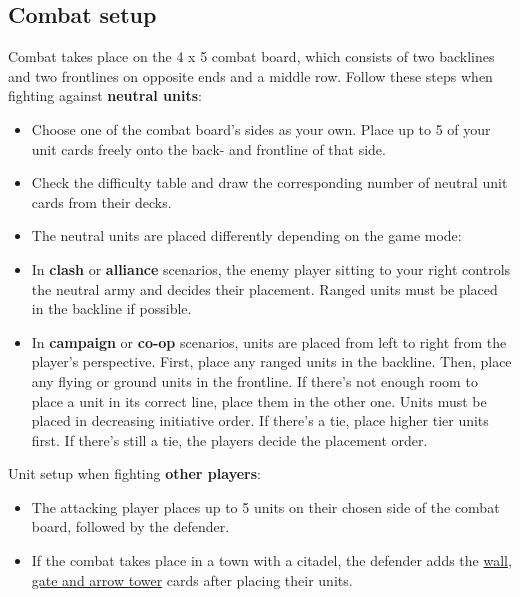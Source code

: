 \documentclass[12pt]{article}
\begin{document}
\subsection*{\hypertarget{Combatsetup}{Combat setup}}

Combat takes place on the 4 x 5 combat board, which consists of two backlines and two frontlines on opposite ends and a middle row. Follow these steps when fighting against \textbf{neutral units}:

\begin{itemize}
 \item Choose one of the combat board’s sides as your own. Place up to 5 of your unit cards freely onto the back- and frontline of that side.
  \item Check the difficulty table and draw the corresponding number of neutral unit cards from their decks.
  \item The neutral units are placed differently depending on the game mode:
        \item In \textbf{clash} or \textbf{alliance} scenarios, the enemy player sitting to your right controls the neutral army and decides their placement. Ranged units must be placed in the backline if possible.
        \item In \textbf{campaign} or \textbf{co-op} scenarios, units are placed from left to right from the player's perspective. First, place any ranged units in the backline. Then, place any flying or ground units in the frontline. If there's not enough room to place a unit in its correct line, place them in the other one. Units must be placed in decreasing initiative order. If there's a tie, place higher tier units first. If there's still a tie, the players decide the placement order.
\end{itemize}
Unit setup when fighting \textbf{other players}:
    \begin{itemize}[wide]
      \item The attacking player places up to 5 units on their chosen side of the combat board, followed by the defender.
      \item If the combat takes place in a town with a citadel, the defender adds the \hyperlink{Walls}{wall, gate and arrow tower} cards after placing their units.
    \end{itemize}

\clearpage
\end{document}
